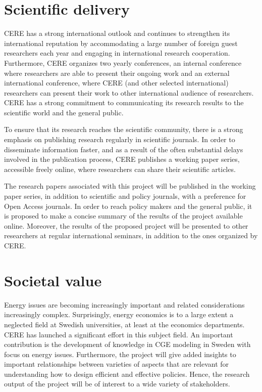 \section{Scientific delivery}
CERE has a strong international outlook and continues to strengthen its international reputation by accommodating a large number of foreign guest researchers each year and engaging in international research cooperation. Furthermore, CERE organizes two yearly conferences, an internal conference where researchers are able to present their ongoing work and an external international conference, where CERE (and other selected international) researchers can present their work to other international audience of researchers. CERE has a strong commitment to communicating its research results to the scientific world and the general public.

To ensure that its research reaches the scientific community, there is a strong emphasis on publishing research regularly in scientific journals. In order to disseminate information faster, and as a result of the often substantial delays involved in the publication process, CERE publishes a working paper series, accessible freely online, where researchers can share their scientific articles.

The research papers associated with this project will be published in the working paper series, in addition to scientific and policy journals, with a preference for Open Access journals. In order to reach policy makers and the general public, it is proposed to make a concise summary of the results of the project available online. Moreover, the results of the proposed project will be presented to other researchers at regular international seminars, in addition to the ones organized by CERE.

\section{Societal value}
Energy issues are becoming increasingly important and related considerations increasingly complex. Surprisingly, energy economics is to a large extent a neglected field at Swedish universities, at least at the economics departments. CERE has launched a significant effort in this subject field. An important contribution is the development of knowledge in CGE modeling in Sweden with focus on energy issues. Furthermore, the project will give added insights to important relationships between varieties of aspects that are relevant for understanding how to design efficient and effective policies. Hence, the research output of the project will be of interest to a wide variety of stakeholders.


